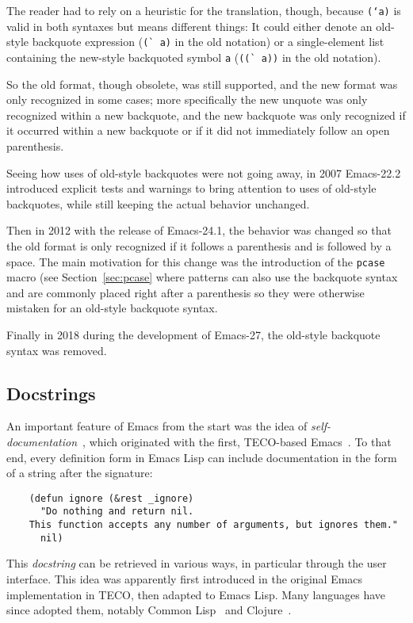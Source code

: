 \documentclass[format=acmsmall, review]{acmart}
\newcommand \Elisp {Emacs Lisp}
\begin{document}
The reader had to rely on a heuristic for the translation, though,
because \texttt{(`a)} is valid in both syntaxes but means different
things: It could either denote an old-style backquote expression
(\verb|(` a)| in the old notation) or a single-element list containing
the new-style backquoted symbol \texttt{a} (\verb|((` a))| in the old
notation).

So the old format, though obsolete, was still supported, and the
new format was only recognized in some cases; more specifically the new
unquote was only recognized within a new backquote, and the new
backquote was only recognized if it occurred within a new backquote or
if it did not immediately follow an open parenthesis.

Seeing how uses of old-style backquotes were not going away, in 2007
Emacs-22.2 introduced explicit tests and warnings to bring attention to uses
of old-style backquotes, while still keeping the actual behavior unchanged.

Then in 2012 with the release of Emacs-24.1, the behavior was changed so
that the old format is only recognized if it follows a parenthesis and is
followed by a space.  The main motivation for this change was the
introduction of the \texttt{pcase} macro (see Section~\ref{sec:pcase} where patterns can also use the
backquote syntax and are commonly placed right after a parenthesis so they
were otherwise mistaken for an old-style backquote syntax.

Finally in 2018 during the development of Emacs-27, the
old-style backquote syntax was removed.

\subsection{Docstrings}
\label{sec:docstrings}

An important feature of Emacs from the start was the idea of
\emph{self-documentation}~\cite{Stallman1981}, which originated with
the first, TECO-based Emacs~\cite{Stallman2018-personal}.  To that end, every
definition form in \Elisp{} can include documentation in the form of a
string after the signature:
\begin{verbatim}
    (defun ignore (&rest _ignore)
      "Do nothing and return nil.
    This function accepts any number of arguments, but ignores them."
      nil)
\end{verbatim}
This \emph{docstring} can be retrieved in various ways, in particular
through the user interface.  This idea was apparently first introduced in
the original Emacs implementation in TECO, then adapted to \Elisp{}.
Many languages have since adopted them, notably Common
Lisp~\cite{HyperSpec} and Clojure~\cite{ClojureDotOrg}.
\end{document}
